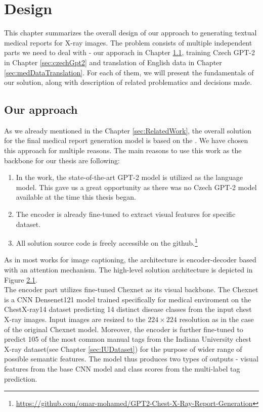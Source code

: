 \chapter{Design}
This chapter summarizes the overall design of our approach to generating textual medical reports for X-ray images. The problem consists of multiple independent parts we need to deal with - our apporach in Chapter \ref{sec:ourApproach}, training Czech GPT-2 in Chapter \ref{sec:czechGpt2} and translation of English data in Chapter \ref{sec:medDataTranslation}. For each of them, we will present the fundamentals of our solution, along with description of related problematics and decisions made.

\section{Our approach}
\label{sec:ourApproach}
As we already mentioned in the Chapter \ref{sec:RelatedWork}, the overall solution for the final medical report generation model is based on the \citet{alfarghaly2021automated}. We have chosen this approach for multiple reasons. The main reasons to use this work as the backbone for our thesis are following:
\begin{enumerate}
	\item In the work, the state-of-the-art GPT-2 model is utilized as the language model. This gave us a great opportunity as there was no Czech GPT-2 model available at the time this thesis began.
	\item The encoder is already fine-tuned to extract visual features for specific dataset.
	\item All solution source code is freely accessible on the github.\footnote[1]{\url{https://github.com/omar-mohamed/GPT2-Chest-X-Ray-Report-Generation}}
\end{enumerate}

As in most works for image captioning, the architecture is encoder-decoder based with an attention mechanism. The high-level solution architecture is depicted in Figure \hyperref[fig01:OmarArchitecutre]{2.1}.\\

The encoder part utilizes fine-tuned Chexnet\citep{rajpurkar2017chexnet} as its visual backbone. The Chexnet is a CNN Densenet121 model trained specifically for medical enviroment on the ChestX-ray14\citep{wang2017chestx} dataset predicting 14 distinct disease classes from the input chest X-ray images. Input images are resized to the $224 \times 224$ resolution as in the case of the original Chexnet model. Moreover, the encoder is further fine-tuned to predict 105 of the most common manual tags from the Indiana University chest X-ray dataset(see Chapter \ref{sec:IUDataset}) for the purpose of wider range of possible semantic features. The model thus produces two types of outputs - visual features from the base CNN model and class scores from the multi-label tag prediction.\\

